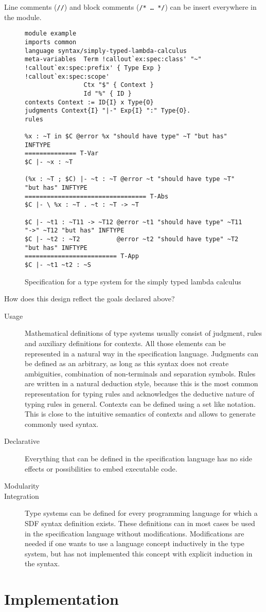 Line comments (\verb|//|) and block comments (\verb|/* … */|) can be
insert everywhere in the module.

\begin{figure}
\scriptsize
\begin{verbatim}
module example
imports common
language syntax/simply-typed-lambda-calculus
meta-variables 	Term !callout`ex:spec:class' "~" !callout`ex:spec:prefix' { Type Exp } !callout`ex:spec:scope'
                Ctx "$" { Context }
                Id "%" { ID }
contexts Context := ID{I} x Type{O}
judgments Context{I} "|-" Exp{I} ":" Type{O}.
rules

%x : ~T in $C @error %x "should have type" ~T "but has" INFTYPE
============== T-Var
$C |- ~x : ~T

(%x : ~T ; $C) |- ~t : ~T @error ~t "should have type ~T" "but has" INFTYPE
================================= T-Abs
$C |- \ %x : ~T . ~t : ~T -> ~T

$C |- ~t1 : ~T11 -> ~T12 @error ~t1 "should have type" ~T11 "->" ~T12 "but has" INFTYPE
$C |- ~t2 : ~T2          @error ~t2 "should have type" ~T2 "but has" INFTYPE
========================= T-App
$C |- ~t1 ~t2 : ~S
\end{verbatim}
\caption{Specification for a type system for the simply typed lambda calculus}
\end{figure}

How does this design reflect the goals declared above?

\begin{description}
\item[Usage] Mathematical definitions of type systems usually consist
  of judgment, rules and auxiliary definitions for contexts. All
  those elements can be represented in a natural way in the
  specification language. Judgments can be defined as an arbitrary, as long
  as this syntax does not create ambiguities, combination of
  non-terminals and separation symbols. Rules are written in a natural
  deduction style, because this is the most common representation for
  typing rules and acknowledges the deductive nature of typing rules
  in general. Contexts can be defined using a set like
  notation. This is close to the intuitive semantics of contexts
  and allows to generate commonly used syntax.
\item[Declarative] Everything that can be defined in the specification
  language has no side effects or possibilities to embed executable
  code.
\item[Modularity] 
\item[Integration] Type systems can be defined for every programming
  language for which a SDF syntax definition exists. These definitions
  can in most cases be used in the specification language without
  modifications. Modifications are needed if one wants to use a
  language concept inductively in the type system, but has not
  implemented this concept with explicit induction in the
  syntax.
\end{description}
\section{Implementation}
\label{sec:generate-sdf}

